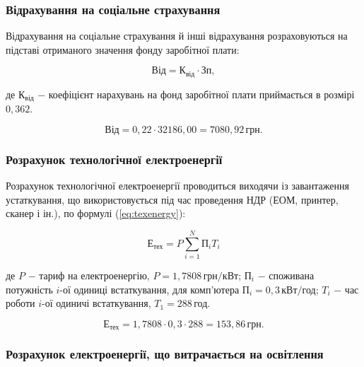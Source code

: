 \subsubsection{Відрахування на соціальне страхування}

Відрахування на соціальне страхування й інші відрахування розраховуються на підставі отриманого значення фонду заробітної плати:

\begin{equation}\label{eq:soc}
\text{Від} = \text{К}_{\text{від}} \cdot \text{Зп},
\end{equation}


\noindent де $\text{К}_{\text{від}}$ $-$ коефіцієнт нарахувань на фонд заробітної плати приймається в розмірі $0,362$.

\[
\text{Від} = 0,22 \cdot 32186,00 = 7080,92 \, \text{грн}.
\]

\vspace{1.5em}

\subsubsection{Розрахунок технологічної електроенергії}

Розрахунок технологічної електроенергії проводиться виходячи із завантаження устаткування, що використовується під час проведення НДР (ЕОМ, принтер, сканер і ін.), по формулі (\ref{eq:texenergy}):

\begin{equation}\label{eq:texenergy}
\text{Е}_{\text{тех}} = P \sum_{i=1}^{N}\text{П}_{i}T_{i}
\end{equation}

\noindent де $P$ $-$ тариф на електроенергію, $P = 1,7808 \, \text{грн}/\text{кВт}$; \newline
\hspace*{15pt} $\text{П}_{i}$ $-$ споживана потужність $i$-ої одиниці встаткування, для комп'ютера $\text{П}_{i} = 0,3 \, \text{кВт}/\text{год}$;\newline
\hspace*{15pt} $T_{i}$ $-$ час роботи $i$-ої одиничі встаткування, $T_{1} = 288 \, \text{год}$.

\[
\text{Е}_{\text{тех}} = 1,7808 \cdot 0,3 \cdot 288 = 153,86 \, \text{грн}.
\]

\vspace{1.5em}

\subsubsection{Розрахунок електроенергії, що витрачається на освітлення}

